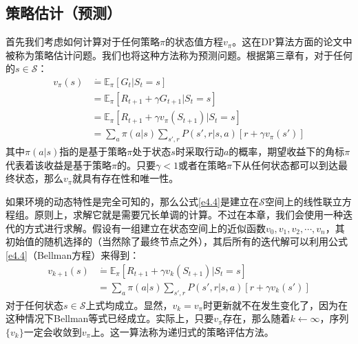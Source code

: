 \documentclass{ctexart}
\begin{document}
        \subsection{策略估计（预测）}
            首先我们考虑如何计算对于任何策略$\pi$的状态值方程$v_{\pi}$。这在DP算法方面的论文中被称为策略估计问题。我们也将这种方法称为预测问题。根据第三章有，对于任何的$s\in \mathcal{S}$：
            \begin{equation}
                \begin{split}
                    v_{\pi}(s) &\dot{=} \mathbb{E}_{\pi}[G_t|S_t=s] \\
                               &= \mathbb{E}_{\pi}[R_{t+1} + \gamma G_{t+1}| S_t=s] \\
                               &= \mathbb{E}_{\pi}[R_{t+1} + \gamma v_{\pi}(S_{t+1})| S_t=s] \\
                               &= \sum_a \pi(a|s) \sum_{s',r} P(s',r|s,a)[r + \gamma v_{\pi}(s')]
                \end{split}
                \label{e4.4}
            \end{equation}
            其中$\pi(a|s)$指的是基于策略$\pi$处于状态$s$时采取行动$a$的概率，期望收益下的角标$\pi$代表着该收益是基于策略$\pi$的。只要$\gamma<1$或者在策略$\pi$下从任何状态都可以到达最终状态，那么$v_{\pi}$就具有存在性和唯一性。

            如果环境的动态特性是完全可知的，那么公式\ref{e4.4}是建立在$\mathcal{S}$空间上的线性联立方程组。原则上，求解它就是需要冗长单调的计算。不过在本章，我们会使用一种迭代的方式进行求解。假设有一组建立在状态空间上的近似函数$v_0,v_1,v_2,\cdots,v_n$，其初始值的随机选择的（当然除了最终节点之外），其后所有的迭代解可以利用公式\ref{e4.4}（Bellman方程）来得到：
            \begin{equation}
                \begin{split}
                    v_{k+1}(s) &\dot{=} \mathbb{E}_{\pi} [R_{t+1} +\gamma v_k(S_{t+1})| S_t=s] \\
                               &= \sum_a \pi(a|s) \sum_{s',r} P(s',r|s,a)[r + \gamma v_k(s')]
                \end{split}
                \label{e4.5}
            \end{equation}
            对于任何状态$s\in \mathcal{S}$上式均成立。显然，$v_k=v_{\pi}$时更新就不在发生变化了，因为在这种情况下Bellman等式已经成立。实际上，只要$v_{\pi}$存在，那么随着$k\leftarrow \infty$，序列$\{v_k\}$一定会收敛到$v_{\pi}$上。这一算法称为递归式的策略评估方法。
\end{document}
